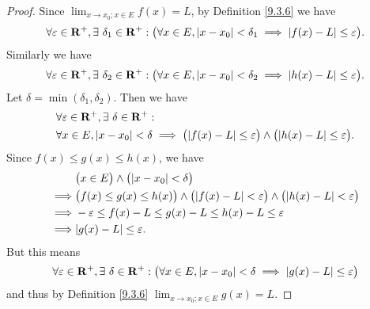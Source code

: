 \begin{proof}
    Since \(\lim_{x \to x_0 ; x \in E} f(x) = L\), by Definition \ref{9.3.6} we have
    \[
        \forall \varepsilon \in \mathbf{R}^+, \exists\ \delta_1 \in \mathbf{R}^+ : \big(\forall x \in E, \abs*{x - x_0} < \delta_1 \implies \abs*{f(x) - L} \leq \varepsilon\big).
    \]
    Similarly we have
    \[
        \forall \varepsilon \in \mathbf{R}^+, \exists\ \delta_2 \in \mathbf{R}^+ : \big(\forall x \in E, \abs*{x - x_0} < \delta_2 \implies \abs*{h(x) - L} \leq \varepsilon\big).
    \]
    Let \(\delta = \min(\delta_1, \delta_2)\).
    Then we have
    \begin{align*}
         & \forall \varepsilon \in \mathbf{R}^+, \exists\ \delta \in \mathbf{R}^+ :                                                                       \\
         & \forall x \in E, \abs*{x - x_0} < \delta \implies \big(\abs*{f(x) - L} \leq \varepsilon\big) \land \big(\abs*{h(x) - L} \leq \varepsilon\big).
    \end{align*}
    Since \(f(x) \leq g(x) \leq h(x)\), we have
    \begin{align*}
                 & \big(x \in E\big) \land \big(\abs*{x - x_0} < \delta\big)                                                                      \\
        \implies & \big(f(x) \leq g(x) \leq h(x)\big) \land \big(\abs*{f(x) - L} < \varepsilon\big) \land \big(\abs*{h(x) - L} < \varepsilon\big) \\
        \implies & -\varepsilon \leq f(x) - L \leq g(x) - L \leq h(x) - L \leq \varepsilon                                                        \\
        \implies & \abs*{g(x) - L} \leq \varepsilon.
    \end{align*}
    But this means
    \[
        \forall \varepsilon \in \mathbf{R}^+, \exists\ \delta \in \mathbf{R}^+ : \big(\forall x \in E, \abs*{x - x_0} < \delta \implies \abs*{g(x) - L} \leq \varepsilon\big)
    \]
    and thus by Definition \ref{9.3.6} \(\lim_{x \to x_0 ; x \in E} g(x) = L\).
\end{proof}